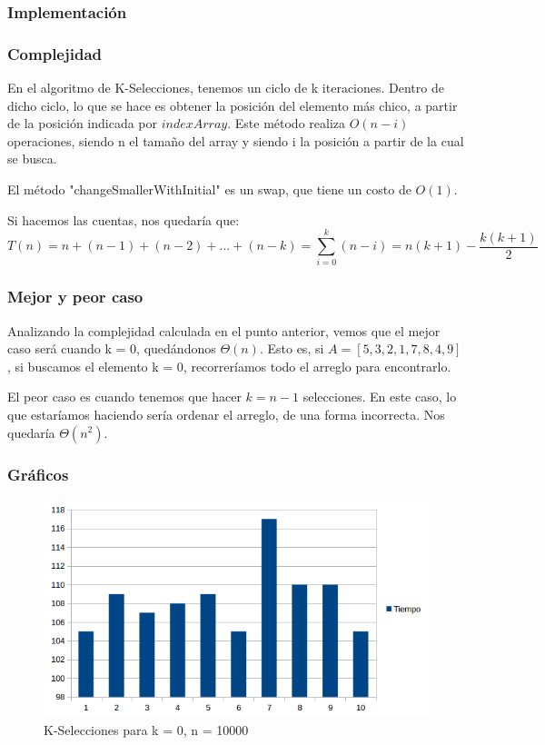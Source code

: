 \subsubsection{Implementación}

\subsubsection{Complejidad}
En el algoritmo de K-Selecciones, tenemos un ciclo de k iteraciones. Dentro de dicho ciclo, lo que se hace es obtener la posición del elemento más chico, a partir de la posición indicada por $indexArray$. Este método realiza $O(n-i)$ operaciones, siendo n el tamaño del array y siendo i la posición a partir de la cual se busca.

El método "changeSmallerWithInitial" es un swap, que tiene un costo de $O(1)$.

Si hacemos las cuentas, nos quedaría que:
$$T(n) = n + (n-1) + (n-2) + ... + (n-k) = \sum_{i=0}^{k} (n - i) = n(k+1) - \frac{k (k+1)}{2}$$
\subsubsection{Mejor y peor caso}
Analizando la complejidad calculada en el punto anterior, vemos que el mejor caso será cuando k = 0, quedándonos $\Theta(n)$. Esto es, si $A = [ 5, 3, 2, 1, 7, 8, 4, 9]$, si buscamos el elemento k = 0, recorreríamos todo el arreglo para encontrarlo.

El peor caso es cuando tenemos que hacer $k = n-1$ selecciones. En este caso, lo que estaríamos haciendo sería ordenar el arreglo, de una forma incorrecta. Nos quedaría $\Theta(n^2)$.
\subsubsection{Gráficos}
\begin{figure}[H]
\centering
\includegraphics[width=\textwidth]{KZero/KSelectK0.png}
\caption{K-Selecciones para k = 0, n = 10000}
\end{figure}

